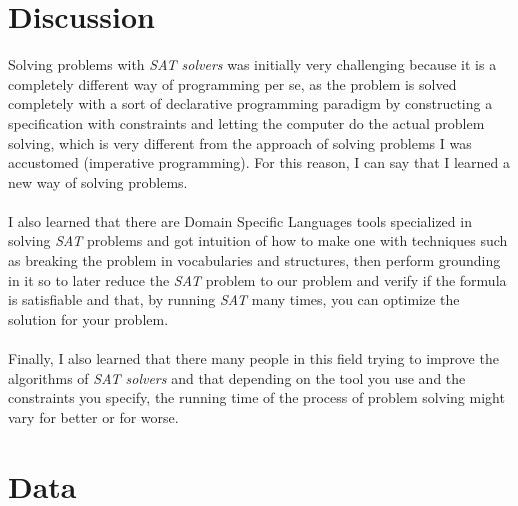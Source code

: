 \documentclass[conference]{IEEEtran}
\newcommand\tab[1][0.3cm]{\hspace*{#1}}
\begin{document}
\section{Discussion}
Solving problems with \textit{SAT solvers} was initially very challenging because it is a completely different way of programming per se, as the problem is solved completely with a sort of declarative programming paradigm by constructing a specification with constraints and letting the computer do the actual problem solving, which is very different from the approach of solving problems I was accustomed (imperative programming). For this reason, I can say that I learned a new way of solving problems.
\\
\\
\tab I also learned that there are Domain Specific Languages tools specialized in solving \textit{SAT} problems and got intuition of how to make one with techniques such as breaking the problem in vocabularies and structures, then perform grounding in it so to later reduce the \textit{SAT} problem to our problem and verify if the formula is satisfiable and that, by running \textit{SAT} many times, you can optimize the solution for your problem.
\\
\\
\tab Finally, I also learned that there many people in this field trying to improve the algorithms of \textit{SAT solvers} and that depending on the tool you use and the constraints you specify, the running time of the process of problem solving might vary for better or for worse.
\section{Data}
\end{document}
